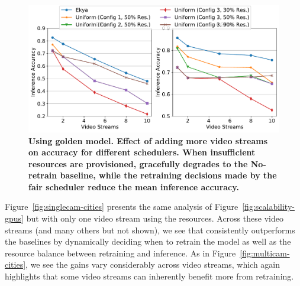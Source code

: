 \begin{figure}
 	\includegraphics[width=\linewidth]{results/scalability/scalability_cams_fixedGPUs_cityscapes_golden_model.pdf}
	\caption{\small \bf Using golden model. Effect of adding more video streams on accuracy for different schedulers. When insufficient resources are provisioned, \name{} gracefully degrades to the No-retrain baseline, while the retraining decisions made by the fair scheduler reduce the mean inference accuracy.}
	\label{fig:scalability-fixedGPUs-accuracy}
\end{figure}


Figure~\ref{fig:singlecam-cities} presents the same analysis of Figure~\ref{fig:scalability-gpus} but with only one video stream using the resources.
Across these video streams (and many others but not shown), we see that \name consistently outperforms the baselines by dynamically deciding when to retrain the model as well as the resource balance between retraining and inference.
As in Figure~\ref{fig:multicam-cities}, we see the gains vary considerably across video streams, which again highlights that some video streams can inherently benefit more from retraining.%

